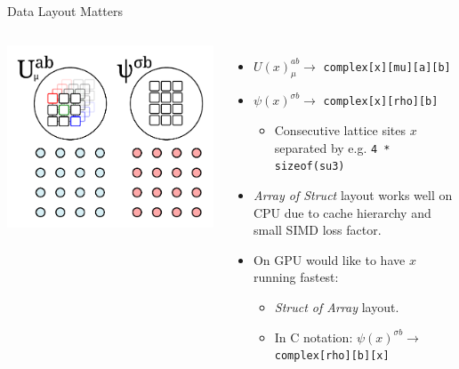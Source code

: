 \begin{frame}{Data Layout Matters}
  \begin{columns}
      \begin{center}
        \includegraphics[width=0.85\linewidth]{graphics/grid_su3_spinor}
      \end{center}
      \begin{itemize}
        \item<1-> $U(x)_\mu^{ab} \rightarrow$ \texttt{complex[x][mu][a][b]}
        \vspace{0.2cm}
        \item<1-> $\psi(x)^{\sigma b} \rightarrow$ \texttt{complex[x][rho][b]}
        \vspace{0.2cm}
        \begin{itemize}
          \item Consecutive lattice sites $x$ separated by e.g. \texttt{4 * sizeof(su3)}
        \end{itemize}
        \vspace{0.6cm}
        \item<3-> \emph{Array of Struct} layout works well on CPU due to cache hierarchy and small SIMD loss factor.
        \vspace{0.6cm}
        \item<4-> On GPU would like to have $x$ running fastest:
        \vspace{0.2cm}
        \begin{itemize}
          \item \emph{Struct of Array} layout.
          \vspace{0.3cm}
          \item In C notation: $\psi(x)^{\sigma b} \rightarrow$ \texttt{complex[rho][b][x]}
        \end{itemize}
      \end{itemize}
  \end{columns}
\end{frame}



